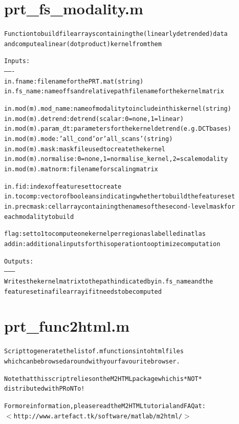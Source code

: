\section{prt\_fs\_modality.m}
\begin{alltt}

 Function to build file arrays containing the (linearly detrended) data
 and compute a linear (dot product) kernel from them
 
 Inputs:
 -------
 in.fname:      filename for the PRT.mat (string)
 in.fs\_name:    name of fs and relative path filename for the kernel matrix
 
 in.mod(m).mod\_name:  name of modality to include in this kernel (string)
 in.mod(m).detrend:   detrend (scalar: 0 = none, 1 = linear)
 in.mod(m).param\_dt:  parameters for the kernel detrend (e.g. DCT bases)
 in.mod(m).mode:      'all\_cond' or 'all\_scans' (string)
 in.mod(m).mask:      mask file used to create the kernel
 in.mod(m).normalise: 0 = none, 1 = normalise\_kernel, 2 = scale modality
 in.mod(m).matnorm:   filename for scaling matrix
 
 in.fid:      index of feature set to create
 in.tocomp:   vector of booleans indicating whether to build the feature set
 in.precmask: cell array containing the names of the second-level mask for
           each modality to build
 
 flag:     set to 1 to compute one kernel per region as labelled in atlas
 addin:    additional inputs for this operation to optimize computation
 
 Outputs:
 --------
 Writes the kernel matrix to the path indicated by in.fs\_name and the
 feature set in a file array if it needs to be computed
\end{alltt}


\section{prt\_func2html.m}
\begin{alltt}

 Script to generate the list of .m functions into html files 
 which can be browsed around with your favourite browser.
 
 Note that this script relies on the M2HTML package which is *NOT*
 distributed with PRoNTo!
 
 For more information, please read the M2HTML tutorial and FAQ at:
    $<$http://www.artefact.tk/software/matlab/m2html/$>$
\end{alltt}


